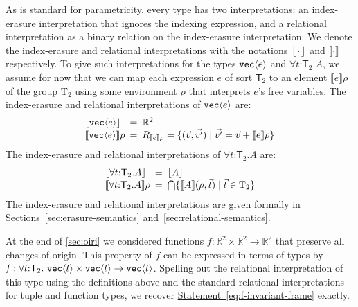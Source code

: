 \documentclass{sigplanconf}
\newcommand{\Transl}[1]{\mathrm{T}_#1}
\newcommand{\SynTransl}[1]{\mathsf{T}_#1}
\newcommand{\sepbar}{\mathrel|}
\newcommand{\tyPrim}[2]{\textup{\texttt{#1}}\langle #2 \rangle}
\newcommand{\tySem}[1]{\left\lfloor #1 \right\rfloor}
\newcommand{\rsem}[1]{\llbracket #1 \rrbracket}
\newcommand{\statementref}[1]{\hyperref[#1]{Statement~\ref*{#1}}}
\newcommand{\sem}[1]{\llbracket #1 \rrbracket}
\theoremstyle{examplestyle}
\theoremstyle{restatementstyle}
\begin{document}
As is standard for parametricity, every type has two interpretations:
an index-erasure interpretation that ignores the indexing expression,
and a relational interpretation as a binary relation on the
index-erasure interpretation. We denote the index-erasure and
relational interpretations with the notations $\tySem{\cdot}$ and
$\rsem{\cdot}{}$ respectively. To give such interpretations for the
types $\tyPrim{vec}{e}$ and $\forall t\mathord:\SynTransl{2}.A$, we
assume for now that we can map each expression $e$ of sort
$\SynTransl{2}$ to an element $\sem{e}\rho$ of the group $\Transl{2}$
using some environment $\rho$ that interprets $e$'s free
variables. The index-erasure and relational interpretations of
$\tyPrim{vec}{e}$ are:
\begin{displaymath}
  \begin{array}{l@{\hspace{0.5em}=\hspace{0.5em}}l}
    \tySem{\tyPrim{vec}{e}} & \mathbb{R}^2
    \\ \rsem{\tyPrim{vec}{e}}{}\rho & R_{\sem{e}\rho} = \{
    (\vec{v},\vec{v'}) \sepbar \vec{v'} = \vec{v} + \sem{e}\rho \}
  \end{array}
\end{displaymath}
The index-erasure and relational interpretations of 
$\forall t\mathord:\SynTransl{2}.A$ are:
\begin{displaymath}
  \begin{array}{l@{\hspace{0.5em}=\hspace{0.5em}}l}
    \tySem{\forall t\mathord:\SynTransl{2}.A} & \tySem{A}
    \\ \rsem{\forall t\mathord:\SynTransl{2}.A}{}\rho & \bigcap\{
    \rsem{A}{}{(\rho,\vec{t})} \sepbar \vec{t} \in \Transl{2} \}
  \end{array}
\end{displaymath}
The index-erasure and relational interpretations are given
formally in Sections~\ref{sec:erasure-semantics}
and~\ref{sec:relational-semantics}. %

At the end of \autoref{sec:oiri} we considered functions $f :
\mathbb{R}^2 \times \mathbb{R}^2 \to \mathbb{R}^2$ that preserve all
changes of origin. This property of $f$ can be expressed in terms of
types by
$  \mathit{f} : \forall t \mathord: \SynTransl{2}.\ \tyPrim{vec}{t}
  \times \tyPrim{vec}{t} \to \tyPrim{vec}{t}$.
Spelling out the relational interpretation of this type using the
definitions above and the standard relational interpretations for
tuple and function types, we recover
\statementref{eq:f-invariant-frame} exactly.
\end{document}
